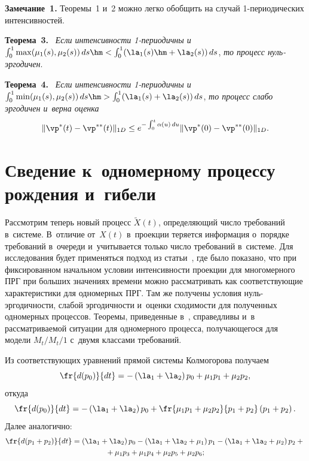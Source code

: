 \noindent
\textbf{Замечание~1.}
Теоремы~1 и~2 можно легко обобщить на случай  1-пе\-рио\-ди\-че\-ских интенсивностей.



\smallskip

\noindent
\textbf{Теорема~3.}\
\textit{Если интенсивности  1-периодичны и}
 $\int\nolimits_0^1\max(\mu_1(s),\mu_2(s))\,ds\hm<\int\nolimits_0^1(\la_1(s)\hm+\la_2(s))\,ds$, 
 \textit{то процесс нуль-эр\-го\-ди\-чен}.
\smallskip

\noindent
\textbf{Теорема~4.}\
\textit{Если интенсивности  1-пе\-рио\-дич\-ны и}
 $\int\nolimits_0^1\min(\mu_1(s),\mu_2(s))\, ds\hm> \int\nolimits_0^1(\la_1(s)+\la_2(s))\,ds$, 
 \textit{то процесс слабо эргодичен и~верна оценка}
\begin{equation*}
\|\vp^*(t)-\vp^{**}(t)\|_{1D}\le e^{-\int\nolimits_0^t \alpha(u)\, du} \|\vp^*(0)-\vp^{**}(0)\|_{1D}.
\end{equation*}



\section{Сведение к~одномерному процессу рождения и~гибели}
\label{ch5nel1p}

Рассмотрим теперь новый процесс $\tilde{X}(t)$, 
определяющий  число требований в~системе. В~отличие от~$X(t)$ в~проекции теряется информация 
о~порядке требований в~очереди и~учитывается только число требований в~системе. 
Для исследования будет применяться подход из статьи~\cite{multid}, где было показано,
 что при фиксированном начальном условии интенсивности проекции для многомерного 
 ПРГ при больших значениях времени можно рассматривать как  соответствующие 
 характеристики для одномерных ПРГ. Там же получены условия нуль-эр\-го\-дич\-ности, 
 слабой эргодичности и~оценки сходимости для полученных  одномерных процессов. Тео\-ре\-мы, приведенные 
 в~\cite{multid}, справедливы и~в рассматриваемой ситуации  для одномерного процесса, 
 получающегося для модели $M_t/M_t/1$ с~двумя  классами требований.


Из соответствующих уравнений прямой системы Колмогорова получаем
$$
\fr{d(p_0)}{dt}= -\left(\la_1+\la_2\right)p_0+\mu_1p_1+\mu_2p_2,
$$
откуда
$$
\fr{d(p_0)}{dt}= -\left(\la_1+\la_2\right)p_0+\fr{\mu_1p_1+\mu_2p_2}{p_1+p_2}\left(p_1+p_2\right).
$$
Далее аналогично:
\begin{multline*}
\fr{d(p_1+p_2)}{dt}= 
\left(\la_1+\la_2\right)p_0-\left(\la_1+\la_2+\mu_1\right)p_1-
\left(\la_1+\la_2+\mu_2\right)p_2+{}\\
{}+\mu_1p_3+\mu_1p_4+\mu_2p_5+\mu_2p_6;
\end{multline*}

